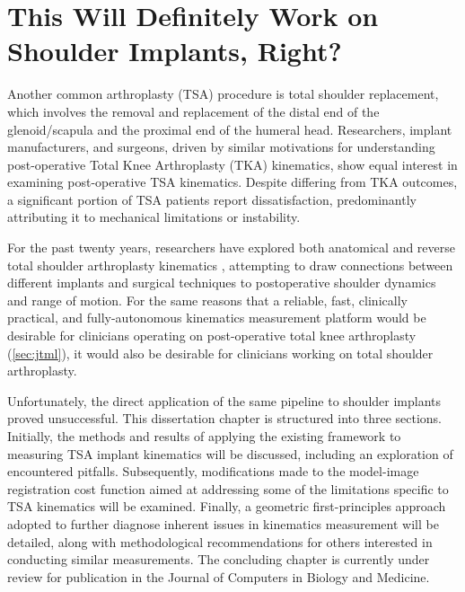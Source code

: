 \chapter{This Will Definitely Work on Shoulder Implants, Right?}{\renewcommand*{\thefootnote}{\fnsymbol{footnote}}

Another common arthroplasty (TSA) procedure is total shoulder replacement, which involves the removal and replacement of the distal end of the glenoid/scapula and the proximal end of the humeral head.
Researchers, implant manufacturers, and surgeons, driven by similar motivations for understanding post-operative Total Knee Arthroplasty (TKA) kinematics, show equal interest in examining post-operative TSA kinematics.
Despite differing from TKA outcomes, a significant portion of TSA patients report dissatisfaction, predominantly attributing it to mechanical limitations or instability.

For the past twenty years, researchers have explored both anatomical and reverse total shoulder arthroplasty kinematics \cite{kijimaVivo3dimensionalAnalysis2015,matsukiVivo3DAnalysis2014,matsukiDynamicVivoGlenohumeral2012,sugiComparingVivoThreedimensional2021,burtonFullyAutomaticTracking2023}, attempting to draw connections between different implants and surgical techniques to postoperative shoulder dynamics and range of motion.
For the same reasons that a reliable, fast, clinically practical, and fully-autonomous kinematics measurement platform would be desirable for clinicians operating on post-operative total knee arthroplasty (\cref{sec:jtml}), it would also be desirable for clinicians working on total shoulder arthroplasty.

Unfortunately, the direct application of the same pipeline to shoulder implants proved unsuccessful.
This dissertation chapter is structured into three sections. Initially, the methods and results of applying the existing framework to measuring TSA implant kinematics will be discussed, including an exploration of encountered pitfalls.
Subsequently, modifications made to the model-image registration cost function aimed at addressing some of the limitations specific to TSA kinematics will be examined.
Finally, a geometric first-principles approach adopted to further diagnose inherent issues in kinematics measurement will be detailed, along with methodological recommendations for others interested in conducting similar measurements.
The concluding chapter is currently under review for publication in the Journal of Computers in Biology and Medicine.

}
